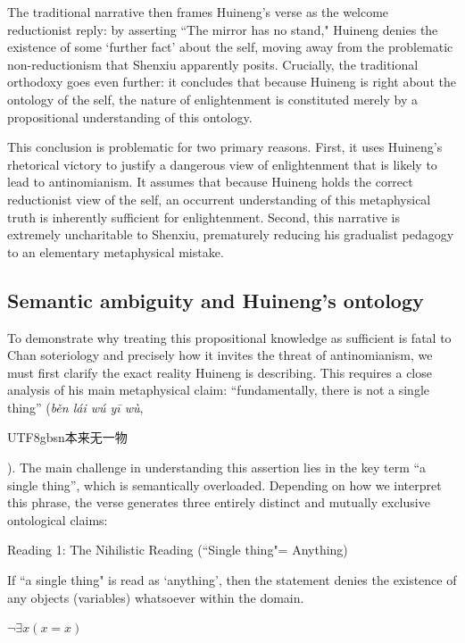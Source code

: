 The traditional narrative then frames Huineng's verse as the welcome
reductionist reply: by asserting ``The mirror has no stand," Huineng
denies the existence of some `further fact' about the self, moving away
from the problematic non-reductionism that Shenxiu apparently posits.
Crucially, the traditional orthodoxy goes even further: it concludes
that because Huineng is right about the ontology of the self, the nature
of enlightenment is constituted merely by a propositional understanding
of this ontology.

This conclusion is problematic for two primary reasons. First, it uses
Huineng's rhetorical victory to justify a dangerous view of
enlightenment that is likely to lead to antinomianism. It assumes that
because Huineng holds the correct reductionist view of the self, an
occurrent understanding of this metaphysical truth is inherently
sufficient for enlightenment. Second, this narrative is extremely
uncharitable to Shenxiu, prematurely reducing his gradualist pedagogy to
an elementary metaphysical mistake.

\subsection{Semantic ambiguity and Huineng's ontology}

To demonstrate why treating this propositional knowledge as sufficient
is fatal to Chan soteriology and precisely how it invites the threat of
antinomianism, we must first clarify the exact reality Huineng is
describing. This requires a close analysis of his main metaphysical
claim: ``fundamentally, there is not a single thing'' (\emph{běn lái wú
yī wù}, \begin{CJK*}{UTF8}{gbsn}本来无一物 \end{CJK*}). The main challenge in understanding this assertion
lies in the key term ``a single thing'', which is semantically
overloaded. Depending on how we interpret this phrase, the verse
generates three entirely distinct and mutually exclusive ontological
claims:

\vspace{0.5em}
\noindent Reading 1: The Nihilistic Reading (``Single thing"= Anything)

\vspace{0.5em}
\noindent If ``a single thing" is read as `anything', then the statement denies the
existence of any objects (variables) whatsoever within the domain.

\vspace{0.5em}
\noindent $\neg\exists x(x=x)$

